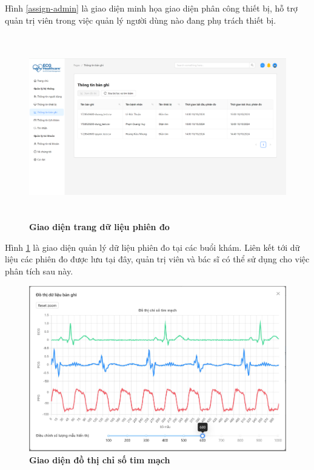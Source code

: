 Hình \ref{assign-admin} là giao diện minh họa giao diện phân công thiết bị, hỗ trợ quản trị viên trong việc quản lý người dùng nào đang phụ trách thiết bị.

\begin{figure}[H]
	\centering
	\includegraphics[width=15cm,height=8cm]{Images/admin_ui/records.png}
	\caption[Giao diện trang dữ liệu phiên đo]{\bfseries \fontsize{12pt}{0pt}\selectfont Giao diện trang dữ liệu phiên đo}
	\label{records-admin}
\end{figure}

Hình \ref{records-admin} là giao diện quản lý dữ liệu phiên đo tại các buổi khám. Liên kết tới dữ liệu các phiên đo được lưu tại đây, quản trị viên và bác sĩ có thể sử dụng cho việc phân tích sau này.

\begin{figure}[H]
	\centering
	\includegraphics[width=15cm]{Images/admin_ui/graph.jpg}
	\caption[Giao diện đồ thị chỉ số tim mạch]{\bfseries \fontsize{12pt}{0pt}\selectfont Giao diện đồ thị chỉ số tim mạch}
	\label{graph}
\end{figure}

